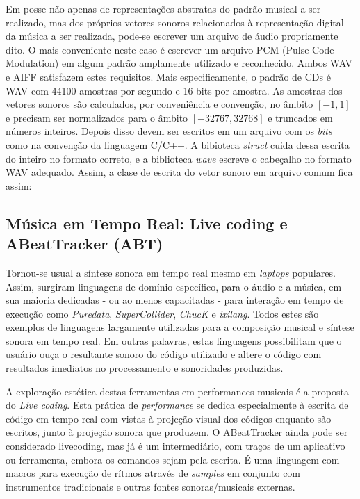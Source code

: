 
Em posse não apenas de representações abstratas do padrão musical a ser realizado, mas dos próprios vetores sonoros relacionados à representação digital da música a ser realizada, pode-se escrever um arquivo de áudio propriamente dito. O mais conveniente neste caso é escrever um arquivo PCM (Pulse Code Modulation) em algum padrão amplamente utilizado e reconhecido. Ambos WAV e AIFF satisfazem estes requisitos. Mais especificamente, o padrão de CDs é WAV com 44100 amostras por segundo e 16 bits por amostra. As amostras dos vetores sonoros são calculados, por conveniência e convenção, no âmbito $[-1,1]$ e precisam ser normalizados para o âmbito $[-32767,32768]$ e truncados em números inteiros. Depois disso devem ser escritos em um arquivo com os \emph{bits} como na convenção da linguagem C/C++. A bibioteca \emph{struct} cuida dessa escrita do inteiro no formato correto, e a biblioteca \emph{wave} escreve o cabeçalho no formato WAV adequado. Assim, a clase de escrita do vetor sonoro em arquivo comum fica assim:



\subsection{Música em Tempo Real: Live coding e ABeatTracker (ABT)}

Tornou-se usual a síntese
sonora em tempo real mesmo em \emph{laptops} populares.
Assim, surgiram linguagens de
domínio específico, para o áudio e a música, em sua maioria dedicadas
- ou ao menos capacitadas - para interação em tempo de
execução como \emph{Puredata}, \emph{SuperCollider}, \emph{ChucK}
 e \emph{ixilang}. Todos estes são exemplos de
linguagens largamente utilizadas para a composição musical e síntese
sonora em tempo real. Em outras palavras, estas linguagens
possibilitam que o usuário ouça o resultante sonoro do código
utilizado e altere o código com resultados imediatos no processamento e
sonoridades produzidas.

A exploração estética destas ferramentas 
em performances musicais é a proposta do \emph{Live coding}.
Esta prática de \emph{performance} se dedica
especialmente à escrita de código em
tempo real com vistas à projeção visual dos códigos enquanto
são escritos, junto à projeção sonora que produzem.
O ABeatTracker ainda pode ser considerado
livecoding, mas já é um intermediário, com traços
de um aplicativo ou ferramenta, embora os comandos sejam
pela escrita. É uma linguagem
com macros para execução de rítmos através de \emph{samples}
em conjunto com instrumentos
tradicionais e outras fontes sonoras/musicais externas.

